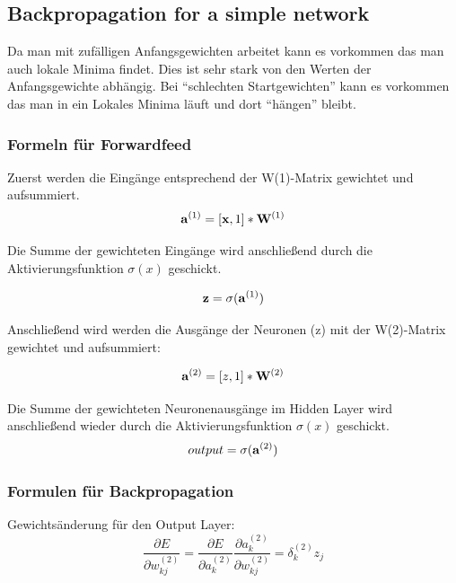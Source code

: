 \subsection{Backpropagation for a simple network}


Da man mit zufälligen Anfangsgewichten arbeitet kann es vorkommen das man auch lokale Minima findet.
Dies ist sehr stark von den Werten der Anfangsgewichte abhängig. Bei ``schlechten Startgewichten'' kann es vorkommen das man in ein Lokales Minima läuft und dort ``hängen'' bleibt.

\subsubsection{Formeln für Forwardfeed}

Zuerst werden die Eingänge entsprechend der W(1)-Matrix gewichtet und aufsummiert.
\begin{equation}
\mathbf{a}^{(1)} = [\mathbf{x},1] * \mathbf{W}^{(1)}
\end{equation}

Die Summe der gewichteten Eingänge wird anschließend durch die Aktivierungsfunktion $\sigma(x)$ geschickt.

\begin{equation}
\mathbf{z} = \sigma(\mathbf{a}^{(1)})
\end{equation}

Anschließend wird werden die Ausgänge der Neuronen (z) mit der W(2)-Matrix gewichtet und aufsummiert:

\begin{equation}
 \mathbf{a}^{(2)} = [z,1] * \mathbf{W}^{(2)}
\end{equation}

Die Summe der gewichteten Neuronenausgänge im Hidden Layer wird anschließend wieder durch die Aktivierungsfunktion $\sigma(x)$ geschickt.
\begin{equation}
 output = \sigma(\mathbf{a}^{(2)})
\end{equation}



\subsubsection{Formulen für Backpropagation}

Gewichtsänderung für den Output Layer:
\begin{equation}
 \frac{\partial E}{\partial w_{kj}^{(2)}} = \frac{\partial E}{\partial a_{k}^{(2)}} \frac{\partial a_{k}^{(2)}}{\partial w_{kj}^{(2)}} = \delta_k^{(2)} z_j
\end{equation}

